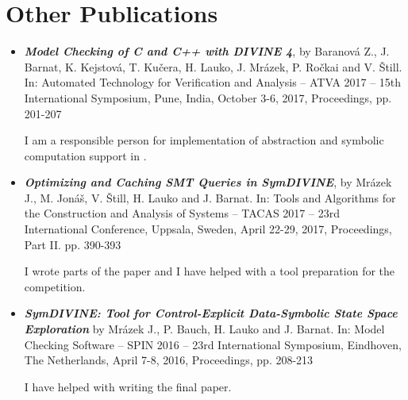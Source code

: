 \section{Other Publications}

\begin{itemize}

\item \textbf{\emph{Model Checking of C and C++ with DIVINE 4}},
by Baranová Z., J. Barnat, K. Kejstová, T. Kučera, H. Lauko, J. Mrázek, P. Ročkai and V. Štill.
In: Automated Technology for Verification and Analysis -- ATVA 2017 --
15th International Symposium, Pune, India, October 3-6, 2017,
Proceedings, pp. 201-207~\cite{Divine17}

I am a responsible person for implementation of abstraction and symbolic
computation support in .

\item \emph{\textbf{Optimizing and Caching SMT Queries in SymDIVINE}},
by Mrázek J., M. Jonáš, V. Štill, H. Lauko and J. Barnat.
In: Tools and Algorithms for the Construction and Analysis of Systems -- TACAS 2017 --
23rd International Conference, Uppsala, Sweden, April 22-29, 2017,
Proceedings, Part II. pp. 390-393~\cite{Mrazek2017}

I wrote parts of the paper and I have helped with a tool preparation for the
\svcomp competition.

\item \textbf{\emph{\textsf{SymDIVINE}: Tool for Control-Explicit Data-Symbolic State Space Exploration}}
by Mrázek J., P. Bauch, H. Lauko and J. Barnat.
In: Model Checking Software -- SPIN 2016 -- 23rd International Symposium, Eindhoven, The Netherlands, April 7-8, 2016, Proceedings, pp. 208-213~\cite{Mrazek2016}

I have helped with writing the final paper.

\end{itemize}
